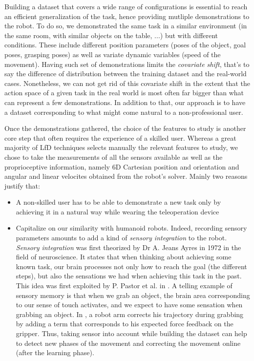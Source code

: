\documentclass[conference]{IEEEtran}
\begin{document}
Building a dataset that covers a wide range of configurations is essential to reach an efficient generalization of the task, hence providing mutliple demonstrations to the robot. To do so, we demonstrated the same task in a similar environment (in the same room, with similar objects on the table, ...) but with different conditions. These include different position parameters (poses of the object, goal poses, grasping poses) as well as variate dynamic variables (speed of the movement). Having such set of demonstrations limits the \textit{covariate  shift}, that's to say the difference of distribution between the training dataset and the real-world cases. Nonetheless, we can not get rid of  this covariate shift in the extent that the action space of a given task in the real world is most often far bigger than what can represent a few demonstrations. In addition to that, our approach is to have a dataset corresponding to what might come natural to a non-professional user.

Once the demonstrations gathered, the choice of the features to study is another core step that often requires the experience of a skilled user. Whereas a great majority of LfD techniques selects manually the relevant features to study, we chose to take the measurements of all the sensors available as well as the proprioceptive information, namely 6D Cartesian position and orientation and angular and linear velocites obtained from the robot's solver. Mainly two reasons justify that:

 \begin{itemize}
     \item A non-skilled user has to be able to demonstrate a new task only by achieving it in a  natural way while wearing the teleoperation device
     \item Capitalize on our similarity with humanoid robots. Indeed, recording sensory parameters amounts to add a kind of \textit{sensory integration} to the robot. \textit{Sensory integration} was first theorized by Dr A. Jeans Ayres in 1972 in the field of neuroscience. It states that when thinking about achieving some known task, our brain processes not only how to reach the goal (the different steps), but also the sensations we had when achieving this task in the past. This idea was first exploited by P. Pastor et al. in \cite{sensory_skill}. A telling example of sensory memory is that when we grab an object, the brain area corresponding to our sense of touch activates, and we expect to have some sensation when grabbing an object. In \cite{sensory_skill}, a robot arm corrects his trajectory during grabbing by adding a term that corresponds to his expected force feedback on the gripper. Thus, taking sensor into account while building the dataset can help to detect new phases of the movement \cite{sensory_seg} and correcting the movement online (after the learning phase). \newline

\end{itemize}
\end{document}
